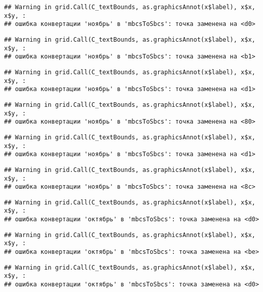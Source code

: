 \documentclass[
]{article}
\begin{document}
\begin{verbatim}
## Warning in grid.Call(C_textBounds, as.graphicsAnnot(x$label), x$x, x$y, :
## ошибка конвертации 'ноябрь' в 'mbcsToSbcs': точка заменена на <d0>
\end{verbatim}

\begin{verbatim}
## Warning in grid.Call(C_textBounds, as.graphicsAnnot(x$label), x$x, x$y, :
## ошибка конвертации 'ноябрь' в 'mbcsToSbcs': точка заменена на <b1>
\end{verbatim}

\begin{verbatim}
## Warning in grid.Call(C_textBounds, as.graphicsAnnot(x$label), x$x, x$y, :
## ошибка конвертации 'ноябрь' в 'mbcsToSbcs': точка заменена на <d1>
\end{verbatim}

\begin{verbatim}
## Warning in grid.Call(C_textBounds, as.graphicsAnnot(x$label), x$x, x$y, :
## ошибка конвертации 'ноябрь' в 'mbcsToSbcs': точка заменена на <80>
\end{verbatim}

\begin{verbatim}
## Warning in grid.Call(C_textBounds, as.graphicsAnnot(x$label), x$x, x$y, :
## ошибка конвертации 'ноябрь' в 'mbcsToSbcs': точка заменена на <d1>
\end{verbatim}

\begin{verbatim}
## Warning in grid.Call(C_textBounds, as.graphicsAnnot(x$label), x$x, x$y, :
## ошибка конвертации 'ноябрь' в 'mbcsToSbcs': точка заменена на <8c>
\end{verbatim}

\begin{verbatim}
## Warning in grid.Call(C_textBounds, as.graphicsAnnot(x$label), x$x, x$y, :
## ошибка конвертации 'октябрь' в 'mbcsToSbcs': точка заменена на <d0>
\end{verbatim}

\begin{verbatim}
## Warning in grid.Call(C_textBounds, as.graphicsAnnot(x$label), x$x, x$y, :
## ошибка конвертации 'октябрь' в 'mbcsToSbcs': точка заменена на <be>
\end{verbatim}

\begin{verbatim}
## Warning in grid.Call(C_textBounds, as.graphicsAnnot(x$label), x$x, x$y, :
## ошибка конвертации 'октябрь' в 'mbcsToSbcs': точка заменена на <d0>
\end{verbatim}
\end{document}
